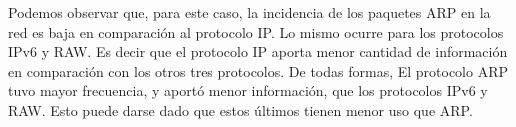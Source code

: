 \FloatBarrier

Podemos observar que, para este caso, la incidencia de los paquetes ARP en la red es baja en comparación al protocolo IP. Lo mismo ocurre para los protocolos IPv6 y RAW. Es decir que el protocolo IP aporta menor cantidad de información en comparación con los otros tres protocolos. De todas formas, El protocolo ARP tuvo mayor frecuencia, y aportó menor información, que los protocolos IPv6 y RAW. Esto puede darse dado que estos últimos tienen menor uso que ARP.
